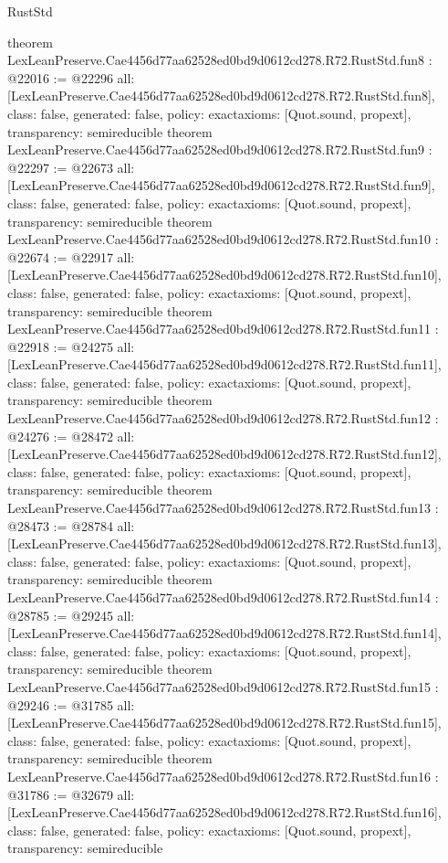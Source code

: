 \begin{lexlean}{RustStd}
\begin{coremodule}
{}
theorem LexLeanPreserve.Cae4456d77aa62528ed0bd9d0612cd278.R72.RustStd.fun8 : @22016 := @22296 {
  all: [LexLeanPreserve.Cae4456d77aa62528ed0bd9d0612cd278.R72.RustStd.fun8],
  class: false,
  generated: false,
  policy: exact{axioms: [Quot.sound, propext]},
  transparency: semireducible
}
theorem LexLeanPreserve.Cae4456d77aa62528ed0bd9d0612cd278.R72.RustStd.fun9 : @22297 := @22673 {
  all: [LexLeanPreserve.Cae4456d77aa62528ed0bd9d0612cd278.R72.RustStd.fun9],
  class: false,
  generated: false,
  policy: exact{axioms: [Quot.sound, propext]},
  transparency: semireducible
}
theorem LexLeanPreserve.Cae4456d77aa62528ed0bd9d0612cd278.R72.RustStd.fun10 : @22674 := @22917 {
  all: [LexLeanPreserve.Cae4456d77aa62528ed0bd9d0612cd278.R72.RustStd.fun10],
  class: false,
  generated: false,
  policy: exact{axioms: [Quot.sound, propext]},
  transparency: semireducible
}
theorem LexLeanPreserve.Cae4456d77aa62528ed0bd9d0612cd278.R72.RustStd.fun11 : @22918 := @24275 {
  all: [LexLeanPreserve.Cae4456d77aa62528ed0bd9d0612cd278.R72.RustStd.fun11],
  class: false,
  generated: false,
  policy: exact{axioms: [Quot.sound, propext]},
  transparency: semireducible
}
theorem LexLeanPreserve.Cae4456d77aa62528ed0bd9d0612cd278.R72.RustStd.fun12 : @24276 := @28472 {
  all: [LexLeanPreserve.Cae4456d77aa62528ed0bd9d0612cd278.R72.RustStd.fun12],
  class: false,
  generated: false,
  policy: exact{axioms: [Quot.sound, propext]},
  transparency: semireducible
}
theorem LexLeanPreserve.Cae4456d77aa62528ed0bd9d0612cd278.R72.RustStd.fun13 : @28473 := @28784 {
  all: [LexLeanPreserve.Cae4456d77aa62528ed0bd9d0612cd278.R72.RustStd.fun13],
  class: false,
  generated: false,
  policy: exact{axioms: [Quot.sound, propext]},
  transparency: semireducible
}
theorem LexLeanPreserve.Cae4456d77aa62528ed0bd9d0612cd278.R72.RustStd.fun14 : @28785 := @29245 {
  all: [LexLeanPreserve.Cae4456d77aa62528ed0bd9d0612cd278.R72.RustStd.fun14],
  class: false,
  generated: false,
  policy: exact{axioms: [Quot.sound, propext]},
  transparency: semireducible
}
theorem LexLeanPreserve.Cae4456d77aa62528ed0bd9d0612cd278.R72.RustStd.fun15 : @29246 := @31785 {
  all: [LexLeanPreserve.Cae4456d77aa62528ed0bd9d0612cd278.R72.RustStd.fun15],
  class: false,
  generated: false,
  policy: exact{axioms: [Quot.sound, propext]},
  transparency: semireducible
}
theorem LexLeanPreserve.Cae4456d77aa62528ed0bd9d0612cd278.R72.RustStd.fun16 : @31786 := @32679 {
  all: [LexLeanPreserve.Cae4456d77aa62528ed0bd9d0612cd278.R72.RustStd.fun16],
  class: false,
  generated: false,
  policy: exact{axioms: [Quot.sound, propext]},
  transparency: semireducible
}
\end{coremodule}
\end{lexlean}
